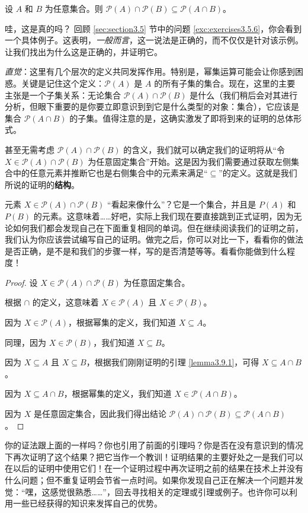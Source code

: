 \begin{proposition}
    设 $A$ 和 $B$ 为任意集合。则 $\mathcal{P}(A) \cap \mathcal{P}(B) \subseteq \mathcal{P}(A \cap B)$。
\end{proposition}

哇，这是真的吗？ 回顾 \ref{sec:section3.5} 节中的问题 \ref{exc:exercises3.5.6}，你会看到一个具体例子。这表明，\emph{一般而言}，这一说法是正确的，而不仅仅是针对该示例。让我们找出为什么这是正确的，并证明它。

\emph{直觉}：这里有几个层次的定义共同发挥作用。特别是，幂集运算可能会让你感到困惑。关键是记住这个定义：$\mathcal{P}(A)$ 是 $A$ 的所有子集的集合。现在，这里的主要主张是一个子集关系：无论集合 $\mathcal{P}(A) \cap \mathcal{P}(B)$ 是什么（我们稍后会对其进行分析，但眼下重要的是你要立即意识到到它是什么类型的对象：集合），它应该是集合 $\mathcal{P}(A \cap B)$ 的子集。值得注意的是，这确实激发了即将到来的证明的总体形式。

甚至无需考虑 $\mathcal{P}(A) \cap \mathcal{P}(B)$ 的含义，我们就可以确定我们的证明将从``令 $X \in \mathcal{P}(A) \cap \mathcal{P}(B)$ 为任意固定集合''开始。这是因为我们需要通过获取左侧集合中的任意元素并推断它也是右侧集合中的元素来满足``$\subseteq$''的定义。这就是我们所说的证明的\textbf{结构}。

元素 $X \in \mathcal{P}(A) \cap \mathcal{P}(B)$ ``看起来像什么''？它是一个集合，并且是 $P(A)$ 和 $P(B)$ 的元素。这意味着……好吧，实际上我们现在要直接跳到正式证明，因为无论如何我们都会发现自己在下面重复相同的单词。但在继续阅读我们的证明之前，我们认为你应该尝试编写自己的证明。做完之后，你可以对比一下，看看你的做法是否正确，是不是和我们的步骤一样，写的是否清楚等等。看看你能做到什么程度！

\begin{proof}
    设 $X \in \mathcal{P}(A) \cap \mathcal{P}(B)$ 为任意固定集合。

    根据 $\cap$ 的定义，这意味着 $X \in \mathcal{P}(A)$ 且 $X \in \mathcal{P}(B)$。

    因为 $X \in \mathcal{P}(A)$，根据幂集的定义，我们知道 $X \subseteq A$。

    同理，因为 $X \in \mathcal{P}(B)$，我们知道 $X \subseteq B$。

    因为 $X \subseteq A$ 且 $X \subseteq B$，根据我们刚刚证明的引理 \ref{lemma3.9.1}，可得 $X \subseteq A \cap B$。

    因为 $X \subseteq A \cap B$，根据幂集的定义，我们知道 $X \in \mathcal{P}(A \cap B)$。

    因为 $X$ 是任意固定集合，因此我们得出结论 $\mathcal{P}(A) \cap \mathcal{P}(B) \subseteq \mathcal{P}(A \cap B)$。
\end{proof}

你的证法跟上面的一样吗？你也引用了前面的引理吗？你是否在没有意识到的情况下再次证明了这个结果？把它当作一个教训！证明结果的主要好处之一是我们可以在以后的证明中使用它们！在一个证明过程中再次证明之前的结果在技术上并没有什么问题；但不重复证明会节省一点时间。如果你发现自己正在解决一个问题并发觉：“嘿，这感觉很熟悉……”，回去寻找相关的定理或引理或例子。也许你可以利用一些已经获得的知识来发挥自己的优势。

